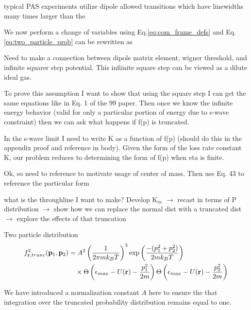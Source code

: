 typical PAS experiments utilize dipole allowed transitions which have linewidths many times larger than the 



We now perform a change of variables using Eq.\ref{eq:com_frame_defs} and Eq.\ref{eq:two_particle_prob} can be rewritten as 




Need to make a connection between dipole matrix element, wigner threshold, and infinite squarer step potential. This infiinite square step can be viewed as a dilute ideal gas. 

To prove this assumption I want to show that using the square step I can get the same equations like in Eq. 1 of the 99 paper. Then once we know the infinite energy behavior (valid for only a particular portion of energy due to s-wave constraint) then we can ask what happens if f(p) is truncated. 

In the s-wave limit I need to write K as a function of f(p) (should do this in the appendix proof and reference in body). Given the form of the loss rate constant K, our problem reduces to determining the form of f(p) when eta is finite.

Ok, so need to reference \cite{Ciuryo2004} to motivate usage of center of mass. Then use \cite{Nicholson2015a} Eq. 43 to reference the particular form 


what is the throughline I want to make? Develop K$_{in}$ $\rightarrow$ recast in terms of P distribution $\rightarrow$ show how we can replace the normal dist with a truncated dist $\rightarrow$ explore the effects of that truncation

Two particle distribution
\begin{equation}
\begin{split}
	f^2_{\mathbf{r},trunc} (\mathbf{p}_1, \mathbf{p}_2) &= A^2 \left(\frac{1}{2 \pi m k_B T}\right)^3 \exp \left( \frac{-(p_1^2 + p_2^2)}{2 m k_B T} \right) \\ &\quad \times \Theta \left( {\epsilon_{max} - U(\mathbf{r}) - \frac{p_1^2}{2m}} \right) \Theta \left( {\epsilon_{max} - U(\mathbf{r}) - \frac{p_2^2}{2m}} \right)
\end{split}
\end{equation}

We have introduced a normalization constant $A$ here to ensure the that integration over the truncated probability distribution remains equal to one.

